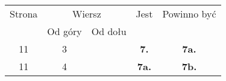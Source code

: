 \documentclass[a4paper,11pt]{article}
\begin{document}
\begin{center}

  \begin{tabular}{|c|c|c|c|c|}
    \hline
    Strona & \multicolumn{2}{c|}{Wiersz} & Jest
                              & Powinno być \\ \cline{2-3}
    & Od góry & Od dołu & & \\
    \hline
    11  &  3 & & \textbf{7.} & \textbf{7a.} \\
    11  &  4 & & \textbf{7a.} & \textbf{7b.} \\
    \hline
  \end{tabular}

\end{center}
\end{document}
